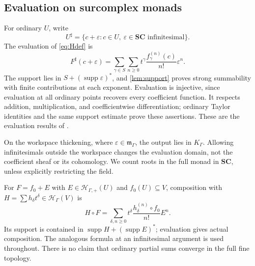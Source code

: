 \documentclass[11pt,letterpaper]{article}
\theoremstyle{definition}
\theoremstyle{remark}
\newcommand{\SC}{\mathbf{SC}}
\newcommand{\HH}{\mathscr H_\Gamma}
\newcommand{\HP}{\mathscr H_{\Gamma,+}}
\newcommand{\KK}{K_\Gamma}
\newcommand{\mm}{\mathfrak m_\Gamma}
\newcommand{\sh}{^{\sharp}}
\newcommand{\supp}{\operatorname{supp}}
\numberwithin{equation}{section}
\begin{document}
\subsection{Evaluation on surcomplex monads}
For ordinary $U$, write
\[
 U\sh=\{c+\varepsilon:c\in U,\ \varepsilon\in\SC\text{ infinitesimal}\}.
\]
The evaluation of \eqref{eq:Hdef} is
\begin{equation}\label{eq:eval}
 F\sh(c+\varepsilon)
 =\sum_{\gamma\in S}\sum_{n\ge0}
 t^\gamma\frac{f_\gamma^{(n)}(c)}{n!}\varepsilon^n.
\end{equation}
The support lies in $S+(\supp\varepsilon)^*$, and \cref{lem:support} proves strong summability with finite contributions at each exponent. Evaluation is injective, since evaluation at all ordinary points recovers every coefficient function. It respects addition, multiplication, and coefficientwise differentiation; ordinary Taylor identities and the same support estimate prove these assertions. These are the evaluation results of \cite[\S5]{Source}.

On the workspace thickening, where $\varepsilon\in\mm$, the output lies in $\KK$. Allowing infinitesimals outside the workspace changes the evaluation domain, not the coefficient sheaf or its cohomology. We count roots in the full monad in $\SC$, unless explicitly restricting the field.

For $F=f_0+E$ with $E\in\HP(U)$ and $f_0(U)\subseteq V$, composition with $H=\sum h_\delta t^\delta\in\HH(V)$ is
\begin{equation}\label{eq:comp}
 H\circ F=\sum_{\delta,n\ge0}t^\delta
 \frac{h_\delta^{(n)}\circ f_0}{n!}E^n.
\end{equation}
Its support is contained in $\supp H+(\supp E)^*$; evaluation gives actual composition. The analogous formula at an infinitesimal argument is used throughout. There is no claim that ordinary partial sums converge in the full fine topology.
\end{document}
